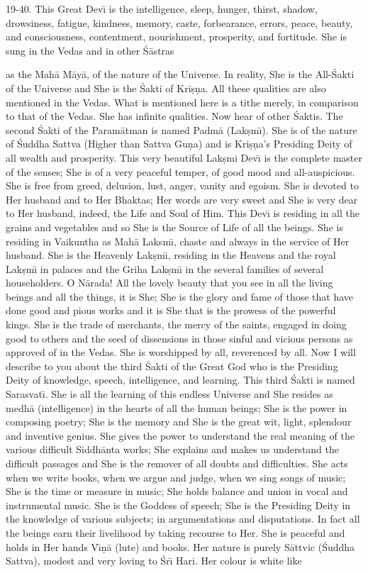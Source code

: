 19-40. This Great Dev\={\i} is the intelligence, sleep, hunger, thirst, shadow, drowsiness, fatigue, kindness, memory, caste, forbearance, errors, peace, beauty, and consciousness, contentment, nourishment, prosperity, and fortitude. She is sung in the Vedas and in other \'S\=astras

as the Mah\=a M\=ay\=a, of the nature of the Universe. In reality, She is the All-\'Sakti of the Universe and She is the \'Sakti of Kri\d{s}\d{n}a. All these qualities are also mentioned in the Vedas. What is mentioned here is a tithe merely, in comparison to that of the Vedas. She has infinite qualities. Now hear of other \'Saktis. The second \'Sakti of the Param\=atman is named Padm\=a (Lak\d{s}m\={\i}). She is of the nature of \'Suddha Sattva (Higher than Sattva Gu\d{n}a) and is Kri\d{s}\d{n}a's Presiding Deity of all wealth and prosperity. This very beautiful Lak\d{s}mi Dev\={\i} is the complete master of the senses; She is of a very peaceful temper, of good mood and all-auspicious. She is free from greed, delusion, lust, anger, vanity and egoism. She is devoted to Her husband and to Her Bhaktas; Her words are very sweet and She is very dear to Her husband, indeed, the Life and Soul of Him. This Dev\={\i} is residing in all the grains and vegetables and so She is the Source of Life of all the beings. She is residing in Vaikuntha as Mah\=a Laksm\={\i}, chaste and always in the service of Her husband. She is the Heavenly Lak\d{s}m\={\i}, residing in the Heavens and the royal Lak\d{s}m\={\i} in palaces and the Griha Lak\d{s}m\={\i} in the several families of several householders. O N\=arada! All the lovely beauty that you see in all the living beings and all the things, it is She; She is the glory and fame of those that have done good and pious works and it is She that is the prowess of the powerful kings. She is the trade of merchants, the mercy of the saints, engaged in doing good to others and the seed of dissensions in those sinful and vicious persons as approved of in the Vedas. She is worshipped by all, reverenced by all. Now I will describe to you about the third \'Sakti of the Great God who is the Presiding Deity of knowledge, speech, intelligence, and learning. This third \'Sakti is named Sarasvat\={\i}. She is all the learning of this endless Universe and She resides as medh\=a (intelligence) in the hearts of all the human beings; She is the power in composing poetry; She is the memory and She is the great wit, light, splendour and inventive genius. She gives the power to understand the real meaning of the various difficult Siddh\=anta works; She explains and makes us understand the difficult passages and She is the remover of all doubts and difficulties. She acts when we write books, when we argue and judge, when we sing songs of music; She is the time or measure in music; She holds balance and union in vocal and instrumental music. She is the Goddess of speech; She is the Presiding Deity in the knowledge of various subjects; in argumentations and disputations. In fact all the beings earn their livelihood by taking recourse to Her. She is peaceful and holds in Her hands V\={\i}\d{n}\=a (lute) and books. Her nature is purely S\=attvic (\'Suddha Sattva), modest and very loving to \'Sr\={\i} Hari. Her colour is white like 